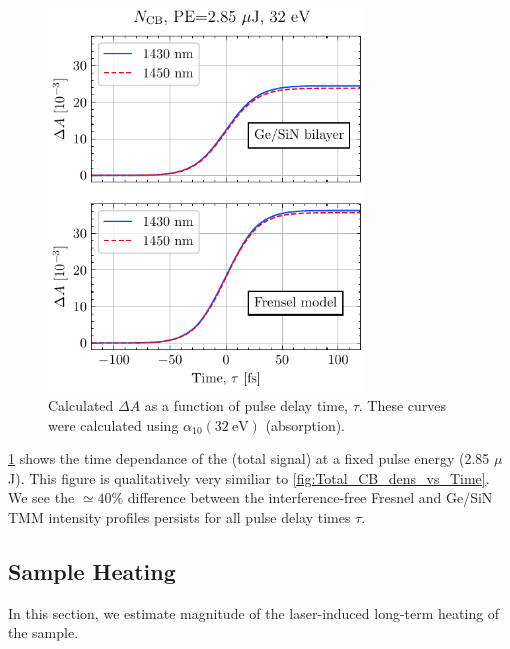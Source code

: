 \begin{figure}
	\centering
	\includegraphics[width=0.75\textwidth]{figures/chap4/FVA_Total_CB_dens_vs_T.pdf}
	\caption{Calculated $\Delta A$ as a function of pulse delay time, $\tau$. These curves were calculated using $\alpha_{10}(32 \ \textrm{eV})$ (absorption).}
	\label{fig:FVA_Total_CB_dens_vs_T}
\end{figure}

\cref{fig:FVA_Total_CB_dens_vs_T} shows the time dependance of the (total signal) at a fixed pulse energy (2.85 $\mu$J). This figure is qualitatively very similiar to \cref{fig:Total_CB_dens_vs_Time}. We see the $\simeq 40\%$ difference between the interference-free Fresnel and Ge/SiN TMM intensity profiles persists for all pulse delay times $\tau$.

\subsection{Sample Heating}

In this section, we estimate magnitude of the laser-induced long-term heating of the sample. 

